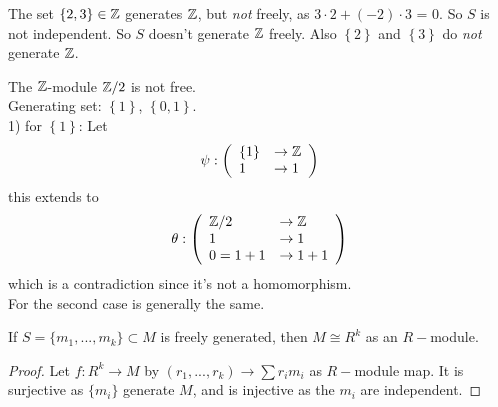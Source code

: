 \documentclass[a4paper]{article}
\begin{document}
\begin{eg}
The set $\left\{2,3\right\} \in \mathbb{Z}$ generates $\mathbb{Z}$, but \emph{not} freely, as $3\cdot 2 + \left(-2\right) \cdot 3$ = 0. So $S$ is not independent. So $S$ doesn't generate $\mathbb{Z}$ freely. Also $\left\{2\right\}$ and $\left\{3\right\}$ do \emph{not} generate $\mathbb{Z}$.
\end{eg}

\begin{eg}
The $\mathbb{Z}$-module $\mathbb{Z}/2$ is not free.\\
Generating set: $\left\{1\right\}$, $\left\{0,1\right\}$.\\
1) for $\left\{1\right\}$: Let
\begin{equation*}
\begin{aligned}
\psi: \left(
\begin{array}{ll}
\left\{1\right\} &\to \mathbb{Z}\\
1 &\to 1
\end{array}
\right)
\end{aligned}
\end{equation*}
this extends to 
\begin{equation*}
\begin{aligned}
\theta: \left(
\begin{array}{ll}
\mathbb{Z}/2 &\to \mathbb{Z}\\
1 &\to 1\\
0=1+1 &\to 1+1
\end{array}
\right)
\end{aligned}
\end{equation*}
which is a contradiction since it's not a homomorphism.\\
For the second case is generally the same.
\end{eg}

\begin{lemma}
If $S=\{m_1,...,m_k\} \subset M$ is freely generated, then $M \cong R^k$ as an $R-$module.
\begin{proof}
Let $f:R^k \to M$ by $(r_1,...,r_k) \to \sum r_i m_i$ as $R-$module map. It is surjective as $\{m_i\}$ generate $M$, and is injective as the $m_i$ are independent.
\end{proof}
\end{lemma}
\end{document}
